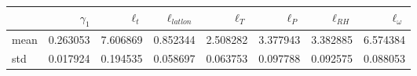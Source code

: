 \begin{tabular}{lrrrrrrr}
\toprule
{} &  $\gamma_1$ &  $\ell_t$ &  $\ell_{latlon}$ &  $\ell_T$ &  $\ell_P$ &  $\ell_{RH}$ &  $\ell_\omega$ \\
\midrule
mean &    0.263053 &  7.606869 &         0.852344 &  2.508282 &  3.377943 &     3.382885 &       6.574384 \\
std  &    0.017924 &  0.194535 &         0.058697 &  0.063753 &  0.097788 &     0.092575 &       0.088053 \\
\bottomrule
\end{tabular}
